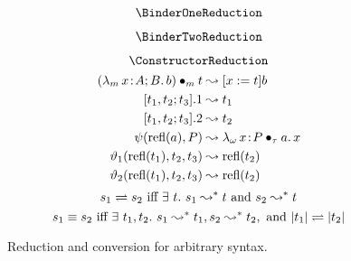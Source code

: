 
\begin{figure}
    \centering
    \begin{minipage}{0.5\textwidth}
        $$\BinderOneReduction$$
    \end{minipage}%
    \begin{minipage}{0.5\textwidth}
        $$\BinderTwoReduction$$
    \end{minipage}
    $$\ConstructorReduction$$
    \begin{align*}
        ({\lambda_m}\, x\! : \! A;B.\, b) \bullet_{m} t &\leadsto [x := t]b \\
        [t_1, t_2; t_3].1 &\leadsto t_1 \\
        [t_1, t_2; t_3].2 &\leadsto t_2 \\
        \psi(\text{refl}(a),P) &\leadsto {\lambda_\omega}\, x\! : \! P \bullet_{\tau} a.\, x \\
        \vartheta_1(\text{refl}(t_1), t_2, t_3) &\leadsto \text{refl}(t_2) \\
        \vartheta_2(\text{refl}(t_1), t_2, t_3) &\leadsto \text{refl}(t_2) \\
    \end{align*}
    $$s_1 \rightleftharpoons s_2 \text{ iff } \exists\ t.\ s_1 \leadsto^* t \text{ and } s_2 \leadsto^* t$$
    $$s_1 \equiv s_2 \text{ iff } \exists\ t_1, t_2.\ s_1 \leadsto^* t_1, s_2 \leadsto^* t_2, \text{ and } |t_1| \rightleftharpoons |t_2|$$
    \caption{Reduction and conversion for arbitrary syntax.}
\end{figure}



